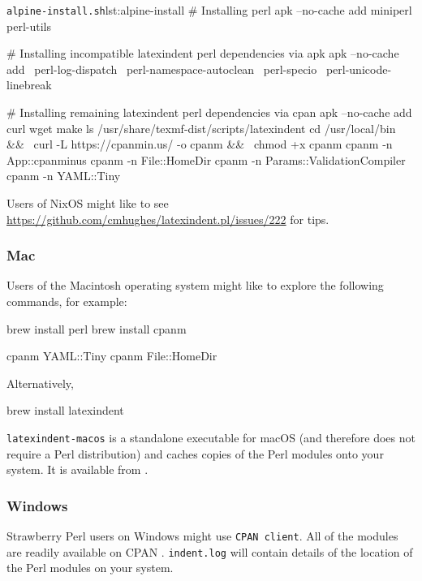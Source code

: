    \begin{cmhlistings}[style=tcblatex,language=Bash]{\texttt{alpine-install.sh}}{lst:alpine-install}
# Installing perl
apk --no-cache add miniperl perl-utils

# Installing incompatible latexindent perl dependencies via apk
apk --no-cache add \
    perl-log-dispatch \
    perl-namespace-autoclean \
    perl-specio \
    perl-unicode-linebreak

# Installing remaining latexindent perl dependencies via cpan
apk --no-cache add curl wget make
ls /usr/share/texmf-dist/scripts/latexindent
cd /usr/local/bin && \
    curl -L https://cpanmin.us/ -o cpanm && \
    chmod +x cpanm
cpanm -n App::cpanminus
cpanm -n File::HomeDir
cpanm -n Params::ValidationCompiler
cpanm -n YAML::Tiny
\end{cmhlistings}

   Users of NixOS might like to see
   \href{https://github.com/cmhughes/latexindent.pl/issues/222}{https://github.com/cmhughes/latexindent.pl/issues/222}
   for tips.
 \subsubsection{Mac}
  Users of the Macintosh operating system might like to explore the following commands,
  for example:

  \begin{commandshell}
brew install perl
brew install cpanm

cpanm YAML::Tiny
cpanm File::HomeDir
\end{commandshell}

  Alternatively,

  \begin{commandshell}
brew install latexindent  
\end{commandshell}

  \texttt{latexindent-macos} is a standalone executable  for macOS (and therefore does not require a Perl distribution)
  and caches copies of the Perl modules onto your system. It is available from \cite{latexindent-home}.
    

 \subsubsection{Windows}
  Strawberry Perl users on Windows might use \texttt{CPAN client}. All of the modules are
  readily available on CPAN \cite{cpan}. \texttt{indent.log} will contain details of the
  location of the Perl modules on your system.


